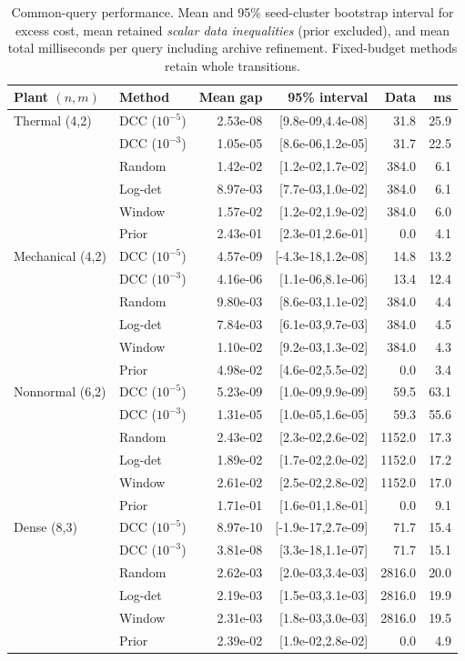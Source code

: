 \begin{table}[ht]
\centering\small
\caption{Common-query performance. Mean and 95\% seed-cluster bootstrap interval for excess cost, mean retained \emph{scalar data inequalities} (prior excluded), and mean total milliseconds per query including archive refinement. Fixed-budget methods retain whole transitions.}\label{tab:main}
\begin{tabular}{llrrrr}\toprule
Plant $(n,m)$ & Method & Mean gap & 95\% interval & Data & ms\\\midrule
Thermal (4,2) & DCC ($10^{-5}$) & 2.53e-08 & [9.8e-09,4.4e-08] & 31.8 & 25.9 \\
 & DCC ($10^{-3}$) & 1.05e-05 & [8.6e-06,1.2e-05] & 31.7 & 22.5 \\
 & Random & 1.42e-02 & [1.2e-02,1.7e-02] & 384.0 & 6.1 \\
 & Log-det & 8.97e-03 & [7.7e-03,1.0e-02] & 384.0 & 6.1 \\
 & Window & 1.57e-02 & [1.2e-02,1.9e-02] & 384.0 & 6.0 \\
 & Prior & 2.43e-01 & [2.3e-01,2.6e-01] & 0.0 & 4.1 \\
\midrule
Mechanical (4,2) & DCC ($10^{-5}$) & 4.57e-09 & [-4.3e-18,1.2e-08] & 14.8 & 13.2 \\
 & DCC ($10^{-3}$) & 4.16e-06 & [1.1e-06,8.1e-06] & 13.4 & 12.4 \\
 & Random & 9.80e-03 & [8.6e-03,1.1e-02] & 384.0 & 4.4 \\
 & Log-det & 7.84e-03 & [6.1e-03,9.7e-03] & 384.0 & 4.5 \\
 & Window & 1.10e-02 & [9.2e-03,1.3e-02] & 384.0 & 4.3 \\
 & Prior & 4.98e-02 & [4.6e-02,5.5e-02] & 0.0 & 3.4 \\
\midrule
Nonnormal (6,2) & DCC ($10^{-5}$) & 5.23e-09 & [1.0e-09,9.9e-09] & 59.5 & 63.1 \\
 & DCC ($10^{-3}$) & 1.31e-05 & [1.0e-05,1.6e-05] & 59.3 & 55.6 \\
 & Random & 2.43e-02 & [2.3e-02,2.6e-02] & 1152.0 & 17.3 \\
 & Log-det & 1.89e-02 & [1.7e-02,2.0e-02] & 1152.0 & 17.2 \\
 & Window & 2.61e-02 & [2.5e-02,2.8e-02] & 1152.0 & 17.0 \\
 & Prior & 1.71e-01 & [1.6e-01,1.8e-01] & 0.0 & 9.1 \\
\midrule
Dense (8,3) & DCC ($10^{-5}$) & 8.97e-10 & [-1.9e-17,2.7e-09] & 71.7 & 15.4 \\
 & DCC ($10^{-3}$) & 3.81e-08 & [3.3e-18,1.1e-07] & 71.7 & 15.1 \\
 & Random & 2.62e-03 & [2.0e-03,3.4e-03] & 2816.0 & 20.0 \\
 & Log-det & 2.19e-03 & [1.5e-03,3.1e-03] & 2816.0 & 19.9 \\
 & Window & 2.31e-03 & [1.8e-03,3.0e-03] & 2816.0 & 19.5 \\
 & Prior & 2.39e-02 & [1.9e-02,2.8e-02] & 0.0 & 4.9 \\
\bottomrule\end{tabular}
\end{table}
